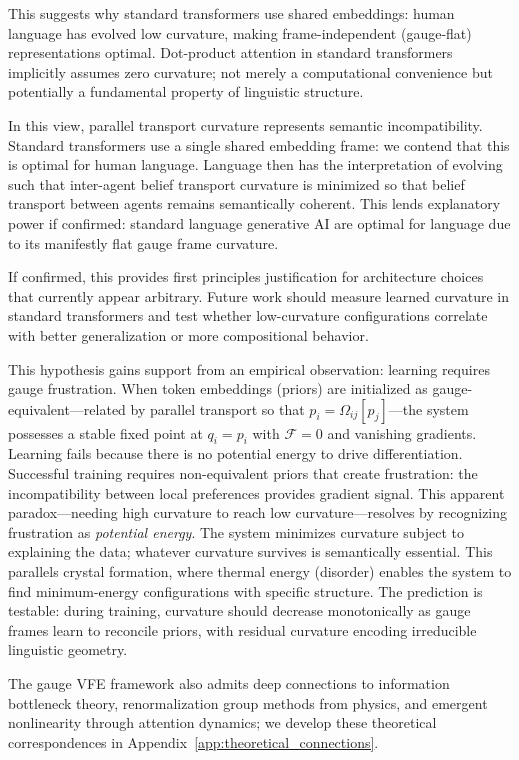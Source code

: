 \documentclass[twoside,11pt]{article}
\begin{document}
This suggests why standard transformers use shared embeddings: human language has evolved low curvature, making frame-independent (gauge-flat) representations optimal. Dot-product attention in standard transformers implicitly assumes zero curvature; not merely a computational convenience but potentially a fundamental property of linguistic structure.

In this view, parallel transport curvature represents semantic incompatibility. Standard transformers use a single shared embedding frame: we contend that this is optimal for human language. Language then has the interpretation of evolving such that inter-agent belief transport curvature is minimized so that belief transport between agents remains semantically coherent. This lends explanatory power if confirmed: standard language generative AI are optimal for language due to its manifestly flat gauge frame curvature.

If confirmed, this provides first principles justification for architecture choices that currently appear arbitrary. Future work should measure learned curvature in standard transformers and test whether low-curvature configurations correlate with better generalization or more compositional behavior.

This hypothesis gains support from an empirical observation: learning requires gauge frustration. When token embeddings (priors) are initialized as gauge-equivalent---related by parallel transport so that $p_i = \Omega_{ij}[p_j]$---the system possesses a stable fixed point at $q_i = p_i$ with $\mathcal{F} = 0$ and vanishing gradients. Learning fails because there is no potential energy to drive differentiation. Successful training requires non-equivalent priors that create frustration: the incompatibility between local preferences provides gradient signal. This apparent paradox---needing high curvature to reach low curvature---resolves by recognizing frustration as \emph{potential energy}. The system minimizes curvature subject to explaining the data; whatever curvature survives is semantically essential. This parallels crystal formation, where thermal energy (disorder) enables the system to find minimum-energy configurations with specific structure. The prediction is testable: during training, curvature should decrease monotonically as gauge frames learn to reconcile priors, with residual curvature encoding irreducible linguistic geometry.

The gauge VFE framework also admits deep connections to information bottleneck theory, renormalization group methods from physics, and emergent nonlinearity through attention dynamics; we develop these theoretical correspondences in Appendix~\ref{app:theoretical_connections}.
\end{document}
